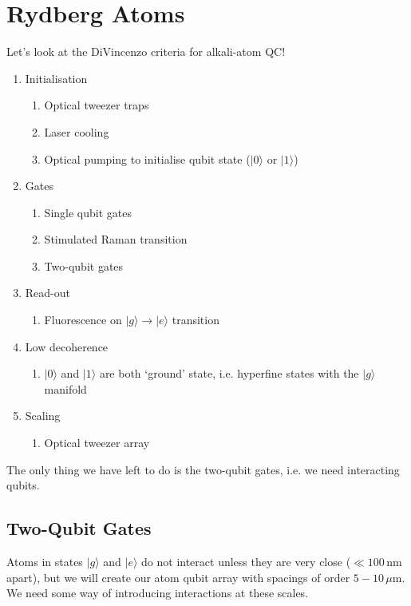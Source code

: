 \documentclass[a4paper, 11pt, normalem]{report}
\begin{document}
\chapter{Rydberg Atoms}
Let's look at the DiVincenzo criteria for alkali-atom QC!
\begin{enumerate}
    \item Initialisation
        \begin{enumerate}
            \item Optical tweezer traps 
            \item Laser cooling 
            \item Optical pumping to initialise qubit state ($|0\rangle$ or $|1\rangle$) 
        \end{enumerate}
    \item Gates
        \begin{enumerate}
            \item Single qubit gates 
            \item Stimulated Raman transition 
            \item Two-qubit gates 
        \end{enumerate}
    \item Read-out
        \begin{enumerate}
            \item Fluorescence on $|g\rangle\to|e\rangle$ transition 
        \end{enumerate}
    \item Low decoherence
        \begin{enumerate}
            \item $|0\rangle$ and $|1\rangle$ are both `ground' state, i.e. hyperfine states with the $|g\rangle$ manifold 
        \end{enumerate}
    \item Scaling
        \begin{enumerate}
            \item Optical tweezer array 
        \end{enumerate}
\end{enumerate}
The only thing we have left to do is the two-qubit gates, i.e. we need interacting qubits.

\section{Two-Qubit Gates}
Atoms in states $|g\rangle$ and $|e\rangle$ do not interact unless they are very close ($\ll100\,$nm apart), but we will create our atom qubit array with spacings of order $5-10\,\mu$m.
We need some way of introducing interactions at these scales.
\end{document}
